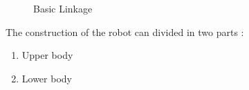 \documentclass[12pt]{article}
\begin{document}
\begin{figure}[h!]
	\ContinuedFloat
	\centering
	\hspace{2cm}
	\newline
	
	\caption{Basic Linkage}
\end{figure}
The construction of the robot can divided in two parts :
\begin{enumerate}
	\item Upper body
	\item Lower body
\end{enumerate}
\end{document}
